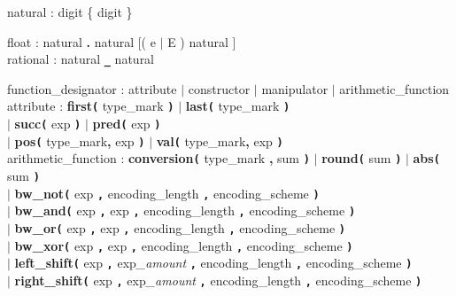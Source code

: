 \documentclass{article}
\begin{document}
\begin{tabbing}
natural : digit \{ digit \}
\end{tabbing}

\begin{tabbing}
float : natural \textbf{.} natural [( e $\mid$ E ) natural ] \\
rational : natural \textbf{\texttt{\_}} natural
\end{tabbing}

\begin{tabbing}
function\_designator : attribute $\mid$ constructor $\mid$ manipulator $\mid$
arithmetic\_function \\
attribute : \= \textbf{first\texttt{(}} type\_mark \textbf{\texttt{)}} $\mid$
\textbf{last\texttt{(}} type\_mark \textbf{\texttt{)}} \\
    \> $\mid$ \textbf{succ\texttt{(}} exp \textbf{\texttt{)}} $\mid$
\textbf{pred\texttt{(}} exp \textbf{\texttt{)}} \\
    \> $\mid$ \textbf{pos\texttt{(}} type\_mark\textbf{,} exp
\textbf{\texttt{)}} $\mid$ \textbf{val\texttt{(}} type\_mark\textbf{,}
exp \textbf{\texttt{)}} \\
arithmetic\_function : \= \textbf{conversion\texttt{(}} type\_mark \textbf{,} sum
\textbf{\texttt{)}} $\mid$ \textbf{round\texttt{(}} sum \textbf{\texttt{)}}
$\mid$ \textbf{abs\texttt{(}} sum \textbf{\texttt{)}} \\
        \> $\mid$ \textbf{bw\_not\texttt{(}} exp \textbf{\texttt{,}}
encoding\_length \textbf{\texttt{,}} encoding\_scheme
        \textbf{\texttt{)}} \\
        \> $\mid$ \textbf{bw\_and\texttt{(}} exp \textbf{\texttt{,}} exp
\textbf{\texttt{,}} encoding\_length \textbf{\texttt{,}} encoding\_scheme
        \textbf{\texttt{)}} \\
        \> $\mid$ \textbf{bw\_or\texttt{(}} exp \textbf{\texttt{,}} exp
\textbf{\texttt{,}} encoding\_length \textbf{\texttt{,}} encoding\_scheme
        \textbf{\texttt{)}} \\
        \> $\mid$ \textbf{bw\_xor\texttt{(}} exp \textbf{\texttt{,}} exp
\textbf{\texttt{,}} encoding\_length \textbf{\texttt{,}} encoding\_scheme
        \textbf{\texttt{)}} \\
        \> $\mid$ \textbf{left\_shift\texttt{(}} exp \textbf{\texttt{,}}
exp\textit{\_amount} \textbf{\texttt{,}} encoding\_length
\textbf{\texttt{,}} encoding\_scheme
        \textbf{\texttt{)}} \\
        \> $\mid$ \textbf{right\_shift\texttt{(}} exp \textbf{\texttt{,}}
exp\textit{\_amount} \textbf{\texttt{,}} encoding\_length
\textbf{\texttt{,}} encoding\_scheme
        \textbf{\texttt{)}} \\


\end{tabbing}
\end{document}
